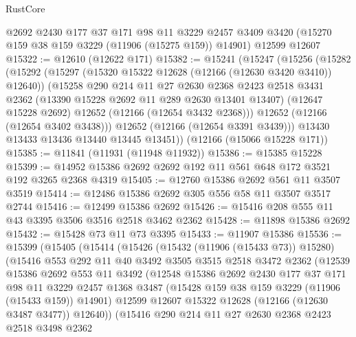 \begin{lexlean}{RustCore}
\begin{coremodule}
    @2692
    @2430
    @177
    @37
    @171
    @98
    @11
    @3229
    @2457
    @3409
    @3420
    (@15270 @159 @38 @159 @3229 (@11906 (@15275 @159)) @14901)
    @12599
    @12607
@15322 := @12610 (@12622 @171)
@15382 := @15241
    (@15247
      (@15256
        (@15282
          (@15292
            (@15297 (@15320 @15322 @12628 (@12166 (@12630 @3420 @3410)) @12640))
            (@15258
              @290
              @214
              @11
              @27
              @2630
              @2368
              @2423
              @2518
              @3431
              @2362
              (@13390 @15228 @2692 @11 @289 @2630 @13401 @13407)
              (@12647 @15228 @2692)
              @12652
              (@12166 (@12654 @3432 @2368)))
            @12652
            (@12166 (@12654 @3402 @3438)))
          @12652
          (@12166 (@12654 @3391 @3439)))
        @13430
        @13433
        @13436
        @13440
        @13445
        @13451))
    (@12166 (@15066 @15228 @171))
@15385 := @11841 (@11931 (@11948 @11932))
@15386 := @15385 @15228
@15399 := @14952 @15386 @2692 @2692 @192 @11 @561 @648 @172 @3521 @192 @3265 @2368 @4319
@15405 := @12760 @15386 @2692 @561 @11 @3507 @3519
@15414 := @12486 @15386 @2692 @305 @556 @58 @11 @3507 @3517 @2744
@15416 := @12499 @15386 @2692
@15426 := @15416 @208 @555 @11 @43 @3395 @3506 @3516 @2518 @3462 @2362
@15428 := @11898 @15386 @2692
@15432 := @15428 @73 @11 @73 @3395
@15433 := @11907 @15386
@15536 := @15399
    (@15405
      (@15414
        (@15426
          (@15432 (@11906 (@15433 @73)) @15280)
          (@15416
            @553
            @292
            @11
            @40
            @3492
            @3505
            @3515
            @2518
            @3472
            @2362
            (@12539
              @15386
              @2692
              @553
              @11
              @3492
              (@12548
                @15386
                @2692
                @2430
                @177
                @37
                @171
                @98
                @11
                @3229
                @2457
                @1368
                @3487
                (@15428 @159 @38 @159 @3229 (@11906 (@15433 @159)) @14901)
                @12599
                @12607
                @15322
                @12628
                (@12166 (@12630 @3487 @3477))
                @12640))
            (@15416
              @290
              @214
              @11
              @27
              @2630
              @2368
              @2423
              @2518
              @3498
              @2362

\end{coremodule}
\end{lexlean}
